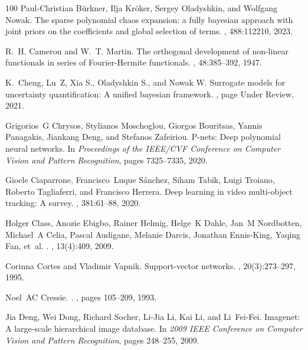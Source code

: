 \documentclass[a4paper,fleqn]{article}
\begin{document}
\begin{thebibliography}{100}
Paul-Christian B{\"u}rkner, Ilja Kr{\"o}ker, Sergey Oladyshkin, and Wolfgang
  Nowak.
\newblock The sparse polynomial chaos expansion: a fully bayesian approach with
  joint priors on the coefficients and global selection of terms.
, 488:112210, 2023.

R.~H. Cameron and W.~T. Martin.
\newblock The orthogonal development of non-linear functionals in series of
  {F}ourier-{H}ermite functionals.
, 48:385--392, 1947.

K.~Cheng, Lu~Z, Xia S., Oladyshkin S., and Nowak W.
\newblock Surrogate models for uncertainty quantification: A unified bayesian
  framework.
, page
  Under Review, 2021.

Grigorios~G Chrysos, Stylianos Moschoglou, Giorgos Bouritsas, Yannis Panagakis,
  Jiankang Deng, and Stefanos Zafeiriou.
\newblock P-nets: Deep polynomial neural networks.
\newblock In {\em Proceedings of the IEEE/CVF Conference on Computer Vision and
  Pattern Recognition}, pages 7325--7335, 2020.

Gioele Ciaparrone, Francisco~Luque S{\'a}nchez, Siham Tabik, Luigi Troiano,
  Roberto Tagliaferri, and Francisco Herrera.
\newblock Deep learning in video multi-object tracking: A survey.
, 381:61--88, 2020.

Holger Class, Anozie Ebigbo, Rainer Helmig, Helge~K Dahle, Jan~M Nordbotten,
  Michael~A Celia, Pascal Audigane, Melanie Darcis, Jonathan Ennis-King, Yaqing
  Fan, et~al.
.
, 13(4):409, 2009.

Corinna Cortes and Vladimir Vapnik.
\newblock Support-vector networks.
, 20(3):273--297, 1995.

Noel~AC Cressie.
.
, pages 105--209, 1993.

Jia Deng, Wei Dong, Richard Socher, Li-Jia Li, Kai Li, and Li~Fei-Fei.
\newblock Imagenet: A large-scale hierarchical image database.
\newblock In {\em 2009 IEEE Conference on Computer Vision and Pattern
  Recognition}, pages 248--255, 2009.


\end{thebibliography}
\end{document}
